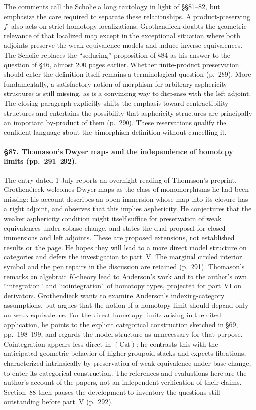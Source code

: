 The comments call the Scholie a long tautology in light of \S\S81--82, but emphasize the care required to separate these relationships. A product-preserving $f_!$ also acts on strict homotopy localizations; Grothendieck doubts the geometric relevance of that localized map except in the exceptional situation where both adjoints preserve the weak-equivalence models and induce inverse equivalences. The Scholie replaces the “seducing” proposition of \S84 as his answer to the question of \S46, almost 200 pages earlier. Whether finite-product preservation should enter the definition itself remains a terminological question (p.\ 289). More fundamentally, a satisfactory notion of morphism for arbitrary asphericity structures is still missing, as is a convincing way to dispense with the left adjoint. The closing paragraph explicitly shifts the emphasis toward contractibility structures and entertains the possibility that asphericity structures are principally an important by-product of them (p.\ 290). These reservations qualify the confident language about the bimorphism definition without cancelling it.



\paragraph{\S87. Thomason's Dwyer maps and the independence of homotopy limits (pp.\ 291--292).}
The entry dated 1 July reports an overnight reading of Thomason's preprint. Grothendieck welcomes Dwyer maps as the class of monomorphisms he had been missing: his account describes an open immersion whose map into its closure has a right adjoint, and observes that this implies asphericity. He conjectures that the weaker asphericity condition might itself suffice for preservation of weak equivalences under cobase change, and states the dual proposal for closed immersions and left adjoints. These are proposed extensions, not established results on the page. He hopes they will lead to a more direct model structure on categories and defers the investigation to part~V. The marginal circled interior symbol and the pen repairs in the discussion are retained (p.\ 291).
Thomason's remarks on algebraic $K$-theory lead to Anderson's work and to the author's own “integration” and “cointegration” of homotopy types, projected for part~VI on derivators. Grothendieck wants to examine Anderson's indexing-category assumptions, but argues that the notion of a homotopy limit should depend only on weak equivalence. For the direct homotopy limits arising in the cited application, he points to the explicit categorical construction sketched in \S69, pp.\ 198--199, and regards the model structure as unnecessary for that purpose. Cointegration appears less direct in $(\mathrm{Cat})$; he contrasts this with the anticipated geometric behavior of higher groupoid stacks and expects fibrations, characterized intrinsically by preservation of weak equivalence under base change, to enter its categorical construction. The references and evaluations here are the author's account of the papers, not an independent verification of their claims. Section~88 then pauses the development to inventory the questions still outstanding before part~V (p.\ 292).

